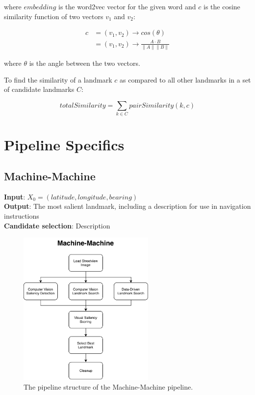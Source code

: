 where $embedding$ is the word2vec vector for the given word and $c$ is the cosine similarity function of two vectors $v_1$ and $v_2$:

\begin{align}\label{eq:cosineSimilarity}
    c &= (v_1, v_2) \longrightarrow cos(\theta) \\
      &= (v_1, v_2) \longrightarrow \frac{A \cdot B}{\parallel A \parallel \parallel B \parallel}
\end{align}

where $\theta$ is the angle between the two vectors.

To find the similarity of a landmark $c$ as compared to all other landmarks in a set of candidate landmarks $C$:

\begin{equation}\label{eq:landmrkSimilarityOverall}
    totalSimilarity = \sum\limits_{k \in C} pairSimilarity(k, c)
\end{equation}

\section{Pipeline Specifics}
\subsection{Machine-Machine}

\noindent \textbf{Input}: $X_0 = (latitude, longitude, bearing)$\\
\textbf{Output}: The most salient landmark, including a description for use in navigation instructions\\
\textbf{Candidate selection}: Description

\begin{figure}[htbp]
  \centering
  \includegraphics[width=0.6\textwidth]{pipeline_diagrams/machine-machine.pdf}
  \caption{The pipeline structure of the Machine-Machine pipeline.}
  \label{fig:pipeline:mm}
\end{figure}

